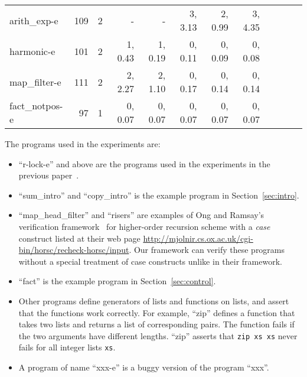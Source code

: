 \begin{table*}
\begin{center}
\begin{tabular}{|l|r|r|r|r|r|r|r|r|r|r|r|}
arith\_exp-e      &  109 & 2 &           - &          - & 3,    3.13 & 2,    0.99 & 3,    4.35 \\
harmonic-e        &  101 & 2 &  1,    0.43 & 1,    0.19 & 0,    0.11 & 0,    0.09 & 0,    0.08 \\
map\_filter-e     &  111 & 2 &  2,    2.27 & 2,    1.10 & 0,    0.17 & 0,    0.14 & 0,    0.14 \\
fact\_notpos-e    &   97 & 1 &  0,    0.07 & 0,    0.07 & 0,    0.07 & 0,    0.07 & 0,    0.07 \\
\hline
\end{tabular}
\end{center}
\end{table*}

The programs used in the experiments are:
\begin{itemize}
\item ``r-lock-e'' and above are the programs used in the experiments in
      the previous paper~\cite{KobayashiPLDI2011}.
\item ``sum\_intro'' and ``copy\_intro'' is the example program in Section~\ref{sec:intro}.
\item ``map\_head\_filter'' and ``risers'' are examples of Ong and
      Ramsay's verification framework~\cite{Ong2011} for higher-order
      recursion scheme with a \textit{case} construct listed at their
      web page
      \url{http://mjolnir.cs.ox.ac.uk/cgi-bin/horsc/recheck-horsc/input}.
      Our framework can verify these programs without a special
      treatment of case constructs unlike in their framework.
\item ``fact'' is the example program in Section~\ref{sec:control}.
\item Other programs define generators of lists and functions on lists,
      and assert that the functions work correctly.  For example,
      ``zip'' defines a function that takes two lists and returns a list of corresponding pairs.
      The function fails if the two arguments have different lengths.
      ``zip'' asserts that \texttt{zip xs xs} never fails for all integer lists \texttt{xs}.
\item A program of name ``xxx-e'' is a buggy version of the program ``xxx''.
\end{itemize}
